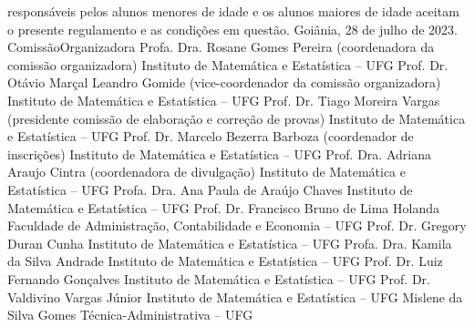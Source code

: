                      responsáveis pelos alunos menores de idade e os alunos maiores de idade
                     aceitam o presente regulamento e as condições em questão.
                                                                       Goiânia, 28 de julho de 2023.
              ComissãoOrganizadora
              Profa. Dra. Rosane Gomes Pereira (coordenadora da comissão organizadora)
              Instituto de Matemática e Estatística – UFG
       Prof. Dr. Otávio Marçal Leandro Gomide (vice-coordenador da comissão
       organizadora)
       Instituto de Matemática e Estatística – UFG
       Prof. Dr. Tiago Moreira Vargas (presidente comissão de elaboração e correção de
       provas)
       Instituto de Matemática e Estatística – UFG
       Prof. Dr. Marcelo Bezerra Barboza (coordenador de inscrições)
       Instituto de Matemática e Estatística – UFG
       Prof. Dra. Adriana Araujo Cintra (coordenadora de divulgação)
       Instituto de Matemática e Estatística – UFG
       Profa. Dra. Ana Paula de Araújo Chaves
       Instituto de Matemática e Estatística – UFG
       Prof. Dr. Francisco Bruno de Lima Holanda
       Faculdade de Administração, Contabilidade e Economia – UFG
       Prof. Dr. Gregory Duran Cunha
       Instituto de Matemática e Estatística – UFG
       Profa. Dra. Kamila da Silva Andrade
       Instituto de Matemática e Estatística – UFG
       Prof. Dr. Luiz Fernando Gonçalves
       Instituto de Matemática e Estatística – UFG
       Prof. Dr. Valdivino Vargas Júnior
       Instituto de Matemática e Estatística – UFG
       Mislene da Silva Gomes
       Técnica-Administrativa – UFG
